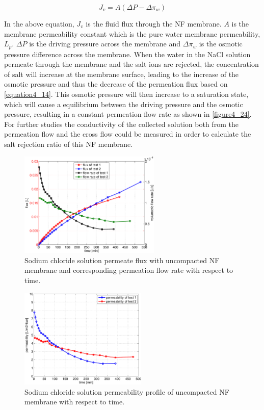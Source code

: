 \begin{equation}
    J_v=A(\Delta P-\Delta \pi _w)
    \label{equation4_14}
\end{equation}

In the above equation, $J_v$ is the fluid flux through the NF membrane. $A$ is the membrane permeability constant which is the pure water membrane permeability, $L_p$. $\Delta P$ is the driving pressure across the membrane and $\Delta \pi _w$ is the osmotic pressure difference across the membrane. When the water in the NaCl solution permeate through the membrane and the salt ions are rejected, the concentration of salt will increase at the membrane surface, leading to the increase of the osmotic pressure and thus the decrease of the permeation flux based on \autoref{equation4_14}. This osmotic pressure will then increase to a saturation state, which will cause a equilibrium between the driving pressure and the osmotic pressure, resulting in a constant permeation flow rate as shown in \autoref{figure4_24}. For further studies the conductivity of the collected solution both from the permeation flow and the cross flow could be measured in order to calculate the salt rejection ratio of this NF membrane.

\begin{figure}[!t]%
\centering
\includegraphics[width=0.6\textwidth]{figures/packagingandtestunderhighpressure/figure4_25.pdf}%
\caption{Sodium chloride solution permeate flux with uncompacted NF membrane and corresponding permeation flow rate with respect to time.}%
\label{figure4_23}%
\end{figure}

\begin{figure}[ht]%
\centering
\includegraphics[width=0.54\textwidth]{figures/packagingandtestunderhighpressure/figure4_26.pdf}%
\caption{Sodium chloride solution permeability profile of uncompacted NF membrane with respect to time.}%
\label{figure4_24}%
\end{figure}

\clearpage


